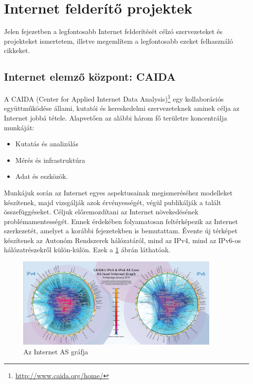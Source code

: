 
\section{Internet felderítő projektek} \label{internet-measurement}



Jelen fejezetben a legfontosabb Internet felderítését célzó szervezeteket és projekteket ismertetem, illetve megemlítem a legfontosabb ezeket felhasználó cikkeket.


\subsection{Internet elemző központ: CAIDA}


A CAIDA (Center for Applied Internet Data Analysis)\footnote{\url{http://www.caida.org/home/}} egy kollaborációs együttműködése állami, kutatói és kereskedelmi szervezeteknek aminek célja az Internet jobbá tétele. Alapvetően az alábbi három fő területre koncentrálja munkáját:

\begin{itemize}
\item Kutatás és analizálás
\item Mérés és infrastruktúra
\item Adat és eszközök.
\end{itemize}

Munkájuk során az Internet egyes aspektusainak megismeréséhez modelleket készítenek, majd vizsgálják azok érvényességét, végül publikálják a talált összefüggéseket. Céljuk előremozdítani az Internet növekedésének problémamentességét. Ennek érdekében folyamatosan feltérképezik az Internet szerkezetét, amelyet a korábbi fejezetekben is bemutattam. Évente új \glqq térképet \grqq készítenek az Autonóm Rendszerek hálózatáról, mind az IPv4, mind az IPv6-os hálózatrészekről külön-külön. Ezek a \ref{fig:caida-poster} ábrán láthatóak. 

\begin{figure}[!ht]
	\centering
	\includegraphics[width=0.9\textwidth, keepaspectratio]{figures/caida-poster.png}
	\caption{Az Internet AS gráfja}
	\label{fig:caida-poster}
\end{figure}

